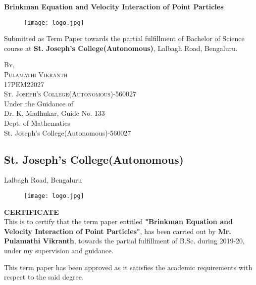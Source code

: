 \documentclass[12pt]{article}
\begin{document}
\begin{titlepage}
  \begin{center}
  \huge{\bfseries Brinkman Equation and Velocity Interaction of Point Particles}\\
  \end{center}
 
  \begin{figure}
  \centering
  \texttt{[image: logo.jpg]}
  \end{figure}
  
  \vspace{5mm}
  \begin{center}
  Submitted as Term Paper towards the partial fulfillment of Bachelor of Science course at \textbf{St. Joseph's College(Autonomous)}, Lalbagh Road, Bengaluru.
  \end{center}

  
  \vspace{20mm}
  \begin{center}
  \textsc{By,\\ Pulamathi Vikranth\\ 17PEM22027\\ St. Joseph's College(Autonomous)-560027}\\
  \vspace{20mm}
  Under the Guidance of\\
  Dr. K. Madhukar, Guide No. 133\\
  Dept. of Mathematics\\
  St. Joseph's College(Autonomous)-560027
  \end{center}
 


\end{titlepage}

\cleardoublepage


\begin{center}
\section*{St. Joseph's College(Autonomous)}
\begin{center}
Lalbagh Road, Bengaluru
\end{center}
\end{center}

\begin{figure}[H]
    \centering
    \texttt{[image: logo.jpg]}
  \end{figure}
\vspace{5mm}
\begin{center}
\textbf{CERTIFICATE}\\
\vspace{10mm}
This is to certify that the term paper entitled \textbf{"Brinkman Equation and Velocity Interaction of Point Particles"}, has been carried out by \textbf{Mr. Pulamathi Vikranth}, towards the partial fulfillment of B.Sc. during 2019-20, under my supervision and guidance.

This term paper has been approved as it satisfies the academic requirements with respect to the said degree.
\end{center}
\end{document}
